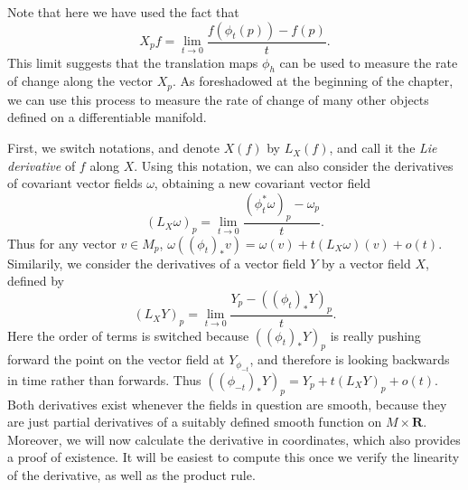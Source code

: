 Note that here we have used the fact that
%
\[ X_p f = \lim_{t \to 0} \frac{f(\phi_t(p)) - f(p)}{t}. \]
%
This limit suggests that the translation maps $\phi_h$ can be used to measure the rate of change along the vector $X_p$. As foreshadowed at the beginning of the chapter, we can use this process to measure the rate of change of many other objects defined on a differentiable manifold.

First, we switch notations, and denote $X(f)$ by $L_X(f)$, and call it the \emph{Lie derivative} of $f$ along $X$. Using this notation, we can also consider the derivatives of covariant vector fields $\omega$, obtaining a new covariant vector field
%
\[ (L_X \omega)_p = \lim_{t \to 0} \frac{(\phi_t^*\omega)_p - \omega_p}{t}. \]
%
%
%
%
%
%
%
%
Thus for any vector $v \in M_p$, $\omega((\phi_t)_* v) = \omega(v) + t (L_X \omega)(v) + o(t)$. Similarily, we consider the derivatives of a vector field $Y$ by a vector field $X$, defined by
%
\[ (L_X Y)_p = \lim_{t \to 0} \frac{Y_p - ((\phi_t)_* Y)_p}{t}. \]
%
Here the order of terms is switched because $((\phi_t)_* Y)_p$ is really pushing forward the point on the vector field at $Y_{\phi_{-t}}$, and therefore is looking backwards in time rather than forwards. Thus $((\phi_{-t})_* Y)_p = Y_p + t (L_X Y)_p + o(t)$. Both derivatives exist whenever the fields in question are smooth, because they are just partial derivatives of a suitably defined smooth function on $M \times \mathbf{R}$. Moreover, we will now calculate the derivative in coordinates, which also provides a proof of existence. It will be easiest to compute this once we verify the linearity of the derivative, as well as the product rule.

